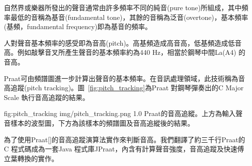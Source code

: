 \documentclass[12pt,a4paper,oneside]{report}
\begin{document}
自然界或樂器所發出的聲音通常由許多頻率不同的純音(pure tone)所組成，其中頻率最低的音稱為基音(fundamental tone)，其餘的音稱為泛音(overtone)，基本頻率(基頻，fundamental frequency)即為基音的頻率。

人對聲音基本頻率的感受即為音高(pitch)。高基頻造成高音高，低基頻造成低音高。例如敲擊音叉所產生聲音的基本頻率約為440 Hz，相當於鋼琴中間La(A4) 的音高。

Praat可由頻譜圖進一步計算出聲音的基本頻率。在音訊處理領域，此技術稱為音高追蹤(pitch tracking)。圖~\ref{fig:pitch_tracking}為Praat 對鋼琴彈奏出的C Major Scale 執行音高追蹤的結果。


\figurewithcaption
{fig:pitch_tracking}
{img/pitch_tracking.png}
{1.0}
{Praat的音高追縱。上方為輸入聲音樣本的波型圖，下方為該樣本的頻譜圖及音高追縱後的結果。}

為了使用Praat[]的音高追蹤演算法實作來判斷音高。我們翻譯了約三千行Praat的C 程式碼成為一套Java 程式庫JPraat，內含有計算聲音強度，音高追蹤及快速傅立葉轉換的實作。


\end{document}
